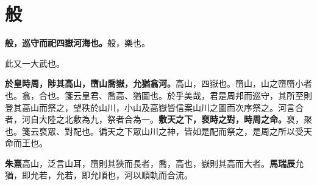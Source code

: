 \section{般}


\textbf{般，巡守而祀四嶽河海也。}{\footnotesize 般，樂也。}

\begin{quoting}此又一大武也。\end{quoting}

\textbf{於皇時周，陟其高山，嶞山喬嶽，允猶翕河。}{\footnotesize 高山，四嶽也。嶞山，山之嶞嶞小者也。翕，合也。箋云皇君、喬高、猶圖也。於乎美哉，君是周邦而巡守，其所至則登其高山而祭之，望秩於山川，小山及高嶽皆信案山川之圖而次序祭之。河言合者，河自大陸之北敷為九，祭者合為一。}\textbf{敷天之下，裒時之對，時周之命。}{\footnotesize 裒，聚也。箋云裒眾、對配也。徧天之下眾山川之神，皆如是配而祭之，是周之所以受天命而王也。}

\begin{quoting}\textbf{朱熹}高山，泛言山耳，嶞則其狹而長者，喬，高也，嶽則其高而大者。\textbf{馬瑞辰}允猶，即允若，允若，即允順也，河以順軌而合流。\end{quoting}

